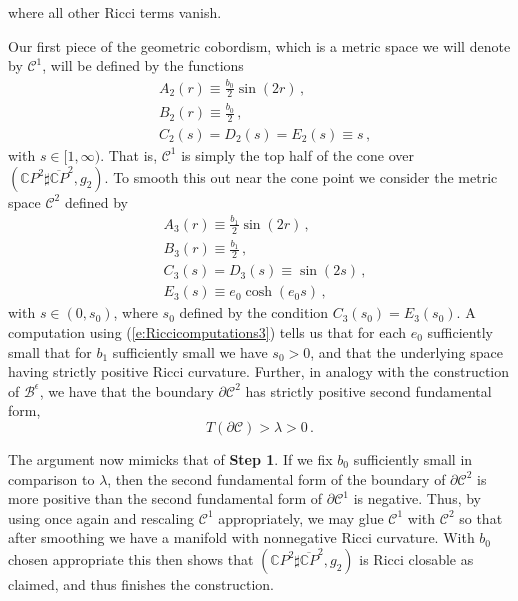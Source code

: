 \documentclass[11pt]{article}
\newcommand{\CC}{\mathds{C}}
\newcommand{\cC}{\mathcal{C}}
\newcommand{\cB}{\mathcal{B}}
\begin{document}
where all other Ricci terms vanish.

Our first piece of the geometric cobordism, which is a metric space we will denote by $\cC^1$, will be defined by the functions
\begin{align}
&A_2(r) \equiv \frac{b_0}{2}\sin(2r)\, , \\
&B_2(r) \equiv \frac{b_0}{2}\, ,\\
&C_2(s)=D_2(s)=E_2(s) \equiv s\, ,
\end{align}
with $s\in [1,\infty)$.  That is, $\cC^1$ is simply the top half of the cone over $(\CC P^2\sharp \overline{\CC P}^2,g_2)$.  To smooth this out near the cone point we consider the metric space $\cC^2$ defined by
\begin{align}
&A_3(r) \equiv \frac{b_1}{2}\sin(2r)\, , \\
&B_3(r) \equiv \frac{b_1}{2}\, , \\
&C_3(s)=D_3(s)\equiv \sin(2s)\, , \\
&E_3(s)\equiv e_0\cosh(e_0 s)\, ,
\end{align}
with $s\in (0,s_0)$, where $s_0$ defined by the condition $C_3(s_0)=E_3(s_0)$.  A computation using (\ref{e:Riccicomputations3}) tells us that for each $e_0$ sufficiently small that for $b_1$ sufficiently small we have $s_0>0$, and that the underlying space having strictly positive Ricci curvature.  Further, in analogy with the construction of $\cB^\epsilon$, we have that the boundary $\partial\cC^2$ has strictly positive second fundamental form,
$$
T(\partial\cC)>\lambda>0\, .
$$

The argument now mimicks that of {\bf Step 1}.  If we fix $b_0$ sufficiently small in comparison to $\lambda$, then the second fundamental form of the boundary of $\partial \cC^2$ is more positive than the second fundamental form of $\partial\cC^1$ is negative.  Thus, by using \cite{P1} once again and rescaling $\cC^1$ appropriately, we may glue $\cC^1$ with $\cC^2$ so that after smoothing we have a manifold with nonnegative Ricci curvature.  With $b_0$ chosen appropriate this then shows that $(\CC P^2\sharp \overline{\CC P}^2,g_2)$ is Ricci closable as claimed, and thus finishes the construction. 



\end{document}
